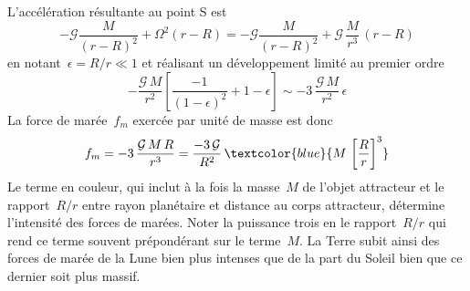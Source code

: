 
\sk
L'accélération résultante au point S est
\[ -\mathcal{G} \frac{M}{(r-R)^2} + \Omega^2 (r-R) = -\mathcal{G} \frac{M}{(r-R)^2} + \mathcal{G} \, \frac{M}{r^3} \, (r-R) \]
\noindent en notant~$\epsilon = R/r \ll 1$ et réalisant un développement limité au premier ordre
\[ -\frac{\mathcal{G}\,M}{r^2} \left[ \frac{-1}{(1-\epsilon)^2} + 1-\epsilon \right] \sim - 3 \, \frac{\mathcal{G}\,M}{r^2} \,\epsilon \]
La force de marée~$f_m$ exercée par unité de masse est donc
\[ f_m = - 3 \, \frac{\mathcal{G}\,M\,R}{r^3} = \frac{-3\,\mathcal{G}}{R^2} \, \textcolor{blue}{ M \, \left[ \frac{R}{r} \right]^3 } \]
\noindent Le terme en couleur, qui inclut à la fois la masse~$M$ de l'objet attracteur et le rapport~$R/r$ entre rayon planétaire et distance au corps attracteur, détermine l'intensité des forces de marées. Noter la puissance trois en le rapport~$R/r$ qui rend ce terme souvent prépondérant sur le terme~$M$. La Terre subit ainsi des forces de marée de la Lune bien plus intenses que de la part du Soleil bien que ce dernier soit plus massif.











